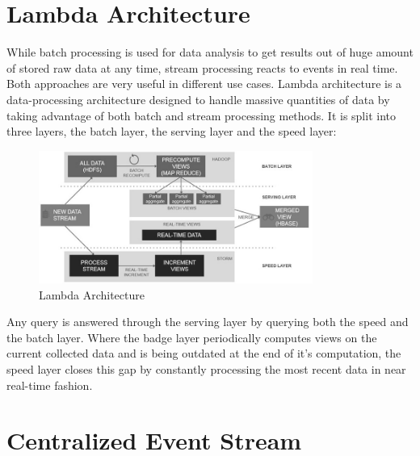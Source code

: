 \section{Lambda Architecture}
While batch processing is used for data analysis to get results out of huge
amount of stored raw data at any time, stream processing reacts to events in
real time. Both approaches are very useful in different use cases. Lambda
architecture is a data-processing architecture designed to handle massive
quantities of data by taking advantage of both batch and stream processing
methods. It is split into three layers, the batch layer, the serving layer and
the speed layer:

\begin{figure}[H]
    \centering
    \includegraphics[width=0.8\textwidth]{images/lambda-architecture.jpg}
    \caption{Lambda Architecture}
    \label{fig:lambda-Architecture}
\end{figure}

Any query is answered through the serving layer by querying both the speed and
the batch layer. Where the badge layer periodically computes views on the
current collected data and is being outdated at the end of it's computation, the
speed layer closes this gap by constantly processing the most recent data in
near real-time fashion. \cite{marz2015big} \cite{PrpSvyOfDSPS}

\section{Centralized Event Stream}
